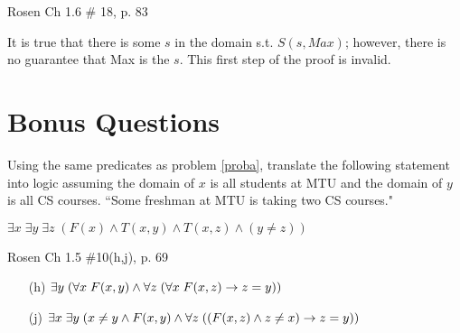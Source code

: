 \begin{questions}
 Rosen Ch 1.6 \# 18, p. 83
    \ifprintanswers
        \vspace{-10pt}
    \fi
\begin{solution}
    It is true that there is some $s$ in the domain s.t. $S(s,Max)$; however, there is no guarantee that Max is the $s$.  This first step of the proof is invalid.
\end{solution}


\section*{Bonus Questions}


\bonusquestion[2] Using the same predicates as problem \ref{proba}, translate the following statement into logic assuming the domain of $x$ is all students at MTU and the domain of $y$ is all CS courses.
``Some freshman at MTU is taking two CS courses."
    \ifprintanswers
        \vspace{-12pt}
    \fi
\begin{solution}
  $\exists x\; \exists y\; \exists z\;(F(x) \wedge T(x,y) \wedge T(x,z) \wedge (y \neq z))$
\end{solution}



\bonusquestion[2] Rosen Ch 1.5 \#10(h,j), p. 69
    \ifprintanswers
        \vspace{-12pt}
    \fi
  \begin{solution}
      \begin{itemize}[itemsep=0pt,parsep=0pt,topsep=0pt,partopsep=0pt]
         \item[(h)] $\exists y\; (\forall x\; F(x,y) \wedge \forall z\; (\forall x\; F(x,z) \rightarrow z = y))$
         \item[(j)] $\exists x\; \exists y\; (x \neq y \wedge F(x,y) \wedge \forall z\; ((F(x,z) \wedge z \neq x) \rightarrow z = y))$
      \end{itemize}
  \end{solution}


\end{questions}


